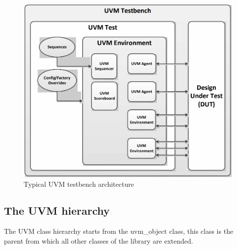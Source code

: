 \documentclass[../main.tex]{subfiles}
\begin{document}
\begin{figure}[h!]
\centering
\includegraphics[scale = 0.4]{diagrams/UVM_testbench.png}
\caption{Typical UVM testbench architecture\cite{accelera}}
\label{fig:uvm_testbench}
\end{figure}

\subsection{The UVM hierarchy}
The UVM class hierarchy starts from the uvm\_object class, this class is the parent from which all other classes of the library are extended. 
\end{document}
